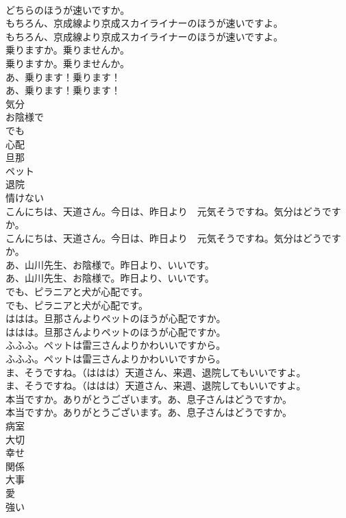 \documentclass[8pt]{extreport}
\begin{document}
\begin{CJK}{UTF8}{min}
\\	どちらのほうが速いですか。 
\\	もちろん、京成線より京成スカイライナーのほうが速いですよ。	
\\	もちろん、京成線より京成スカイライナーのほうが速いですよ。 
\\	乗りますか。乗りませんか。	
\\	乗りますか。乗りませんか。 
\\	あ、乗ります！乗ります！	
\\	あ、乗ります！乗ります！ 
\\	気分
\\	お陰様で
\\	でも
\\	心配
\\	旦那
\\	ペット
\\	退院
\\	情けない
\\	こんにちは、天道さん。今日は、昨日より　元気そうですね。気分はどうですか。	
\\	こんにちは、天道さん。今日は、昨日より　元気そうですね。気分はどうですか。 
\\	あ、山川先生、お陰様で。昨日より、いいです。	
\\	あ、山川先生、お陰様で。昨日より、いいです。 
\\	でも、ピラニアと犬が心配です。	
\\	でも、ピラニアと犬が心配です。 
\\	ははは。旦那さんよりペットのほうが心配ですか。	
\\	ははは。旦那さんよりペットのほうが心配ですか。 
\\	ふふふ。ペットは雷三さんよりかわいいですから。	
\\	ふふふ。ペットは雷三さんよりかわいいですから。 
\\	ま、そうですね。（ははは）天道さん、来週、退院してもいいですよ。	
\\	ま、そうですね。（ははは）天道さん、来週、退院してもいいですよ。 
\\	本当ですか。ありがとうございます。あ、息子さんはどうですか。	
\\	本当ですか。ありがとうございます。あ、息子さんはどうですか。 
\\	病室
\\	大切
\\	幸せ
\\	関係
\\	大事
\\	愛
\\	強い

\end{CJK}
\end{document}
